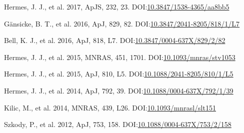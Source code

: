 \documentclass[print]{cv-style}
\begin{document}
\begin{entrylist}
  {\small Hermes, J. J., et al. 2017, ApJS, 232, 23. \textsc{DOI:}\href{http://dx.doi.org/10.3847/1538-4365/aa8bb5}{10.3847/1538-4365/aa8bb5}}

  {\small Gänsicke, B. T., et al. 2016, ApJ, 829, 82. \textsc{DOI:}\href{http://dx.doi.org/10.3847/2041-8205/818/1/L7}{10.3847/2041-8205/818/1/L7}}

  {\small Bell, K. J., et al. 2016, ApJ, 818, L7. \textsc{DOI:}\href{http://dx.doi.org/10.3847/0004-637X/829/2/82}{10.3847/0004-637X/829/2/82}}

  {\small Hermes, J. J., et al. 2015, MNRAS, 451, 1701. \textsc{DOI:}\href{http://dx.doi.org/10.1093/mnras/stv1053}{10.1093/mnras/stv1053}}

  {\small Hermes, J. J., et al. 2015, ApJ, 810, L5. \textsc{DOI:}\href{http://dx.doi.org/10.1088/2041-8205/810/1/L5}{10.1088/2041-8205/810/1/L5}}

  {\small Hermes, J. J., et al. 2014, ApJ, 792, 39. \textsc{DOI:}\href{http://dx.doi.org/10.1088/0004-637X/792/1/39}{10.1088/0004-637X/792/1/39}}

  {\small Kilic, M., et al. 2014, MNRAS, 439, L26. \textsc{DOI:}\href{http://dx.doi.org/10.1093/mnrasl/slt151}{10.1093/mnrasl/slt151}}

  {\small Szkody, P., et al. 2012, ApJ, 753, 158. \textsc{DOI:}\href{http://dx.doi.org/10.1088/0004-637X/753/2/158}{10.1088/0004-637X/753/2/158}}
\end{entrylist}
\end{document}
